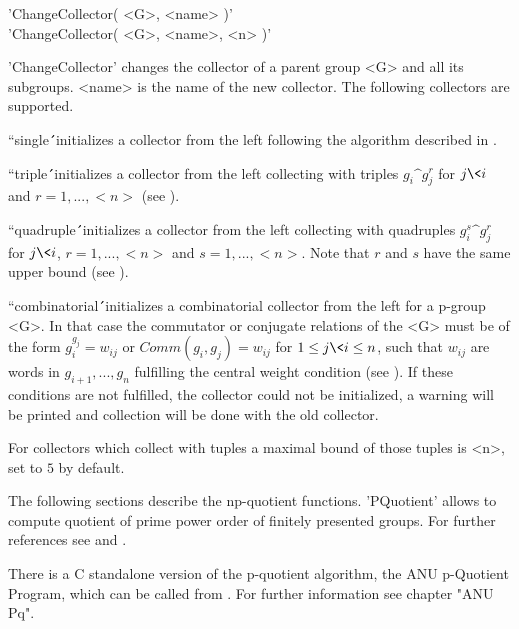 
'ChangeCollector( <G>, <name> )' \\
'ChangeCollector( <G>, <name>, <n> )'

'ChangeCollector' changes the collector of a parent group <G> and all its
subgroups.  <name>  is  the name of  the  new collector.   The  following
collectors are supported.

``single\'\'\  initializes  a  collector  from  the  left  following  the
algorithm described in \cite{LS90}.

``triple\'\'\  initializes a collector   from the left   collecting  with
triples $g_i\^{g_j^r}$  for $j   \<  i$  and  $r =  1,  ...,    <n>$ (see
\cite{Bis89}).

``quadruple\'\'\  initializes a collector  from the  left collecting with
quadruples ${g_i^s}\^{g_j^r}$ for $j \< i$, $r = 1, ..., <n>$ and $s = 1,
..., <n>$.  Note  that  $r$   and $s$  have   the same  upper bound  (see
\cite{Bis89}).

``combinatorial\'\'\ initializes a  combinatorial collector from the left
for a p-group <G>.  In that case the commutator or conjugate relations of
the <G> must be of  the  form $g_i^{g_j} = w_{ij}$ or $Comm( g_i, g_j ) =
w_{ij}$ for  $1 \leq j \< i \leq  n$,  such  that $w_{ij}$  are  words in
$g_{i+1},  ...,  g_n$  fulfilling   the  central  weight  condition  (see
\cite{HN80,Vau84}).  If these conditions are not fulfilled, the collector
could not be initialized,  a  warning will be printed and collection will
be done with the old collector.

For  collectors which collect with tuples a maximal bound of those tuples
is <n>, set to $5$ by default.



The  following sections describe the np-quotient  functions.  'PQuotient'
allows  to compute  quotient  of prime power order of  finitely presented
groups.  For further references see \cite{HN80} and \cite{Vau84}.

There is  a  C  standalone version of the  p-quotient algorithm, the  ANU
p-Quotient Program,  which  can  be  called  from  {\GAP}.   For  further
information see chapter "ANU Pq".


